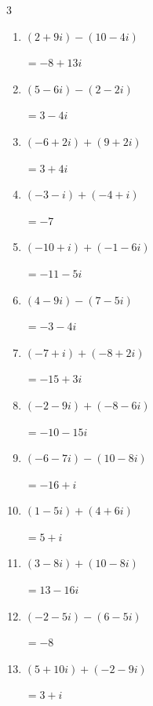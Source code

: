 \begin{multicols}{3}
\begin{enumerate}
        $\displaystyle =2-10i$

  \item $\displaystyle (2+9i) - (10-4i)$

        $\displaystyle =-8+13i$

  \item $\displaystyle (5-6i) - (2-2i)$

        $\displaystyle =3-4i$

  \item $\displaystyle (-6+2i) + (9+2i)$

        $\displaystyle =3+4i$

  \item $\displaystyle (-3-i) + (-4+i)$

        $\displaystyle =-7$

  \item $\displaystyle (-10+i) + (-1-6i)$

        $\displaystyle =-11-5i$

  \item $\displaystyle (4-9i) - (7-5i)$

        $\displaystyle =-3-4i$

  \item $\displaystyle (-7+i) + (-8+2i)$

        $\displaystyle =-15+3i$

  \item $\displaystyle (-2-9i) + (-8-6i)$

        $\displaystyle =-10-15i$

  \item $\displaystyle (-6-7i) - (10-8i)$

        $\displaystyle =-16+i$

  \item $\displaystyle (1-5i) + (4+6i)$

        $\displaystyle =5+i$

  \item $\displaystyle (3-8i) + (10-8i)$

        $\displaystyle =13-16i$

  \item $\displaystyle (-2-5i) - (6-5i)$

        $\displaystyle =-8$

  \item $\displaystyle (5+10i) + (-2-9i)$

        $\displaystyle =3+i$

\columnbreak %


\end{enumerate}
\end{multicols}
